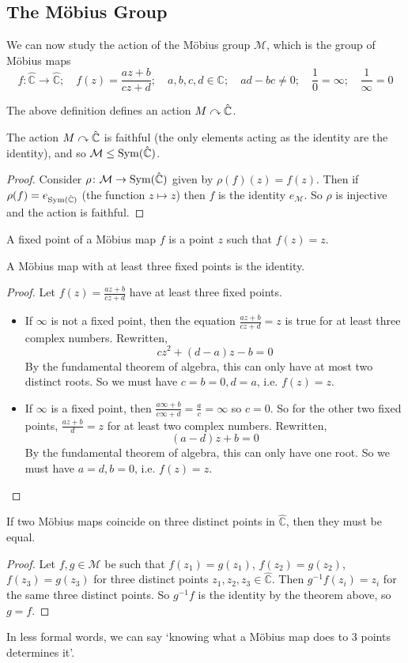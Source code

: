 \subsection{The M\"obius Group}
We can now study the action of the M\"obius group $\mathcal M$, which is the group of M\"obius maps
\[ f\colon \hat{\mathbb C} \to \hat{\mathbb C};\quad f(z) = \frac{az+b}{cz+d};\quad a,b,c,d\in\mathbb C;\quad ad-bc\neq 0;\quad \frac{1}{0}=\infty;\quad\frac{1}{\infty}=0 \]
\begin{remark}
	The above definition defines an action $M \curvearrowright \hat{\mathbb C}$.
\end{remark}
\begin{proposition}
	The action $M \curvearrowright \hat{\mathbb C}$ is faithful (the only elements acting as the identity are the identity), and so $\mathcal M \leq \operatorname{Sym}(\hat{\mathbb C})$.
\end{proposition}
\begin{proof}
	Consider $\rho\colon \mathcal M \to \operatorname{Sym}(\hat{\mathbb C})$ given by $\rho(f)(z) = f(z)$. Then if $\rho(f) = e_{\operatorname{Sym}(\hat{\mathbb C})}$ (the function $z \mapsto z$) then $f$ is the identity $e_{\mathcal M}$. So $\rho$ is injective and the action is faithful.
\end{proof}
\begin{definition}
	A fixed point of a M\"obius map $f$ is a point $z$ such that $f(z) = z$.
\end{definition}
\begin{theorem}
	A M\"obius map with at least three fixed points is the identity.
\end{theorem}
\begin{proof}
	Let $f(z) = \frac{az+b}{cz+d}$ have at least three fixed points.
	\begin{itemize}
		\item If $\infty$ is not a fixed point, then the equation $\frac{az+b}{cz+d} = z$ is true for at least three complex numbers. Rewritten,
		      \[ cz^2 + (d-a)z-b=0 \]
		      By the fundamental theorem of algebra, this can only have at most two distinct roots. So we must have $c=b=0, d=a$, i.e. $f(z) = z$.
		\item If $\infty$ is a fixed point, then $\frac{a\infty + b}{c\infty + d} = \frac{a}{c} = \infty$ so $c = 0$. So for the other two fixed points, $\frac{az+b}{d} = z$ for at least two complex numbers. Rewritten,
		      \[ (a-d)z+b=0 \]
		      By the fundamental theorem of algebra, this can only have one root. So we must have $a=d,b=0$, i.e. $f(z) = z$.
	\end{itemize}
\end{proof}
\begin{corollary}
	If two M\"obius maps coincide on three distinct points in $\hat{\mathbb C}$, then they must be equal.
\end{corollary}
\begin{proof}
	Let $f, g \in \mathcal M$ be such that $f(z_1) = g(z_1)$, $f(z_2) = g(z_2)$, $f(z_3) = g(z_3)$ for three distinct points $z_1, z_2, z_3 \in \hat{\mathbb C}$. Then $g^{-1}f(z_i) = z_i$ for the same three distinct points. So $g^{-1}f$ is the identity by the theorem above, so $g = f$.
\end{proof}
In less formal words, we can say `knowing what a M\"obius map does to 3 points determines it'.
